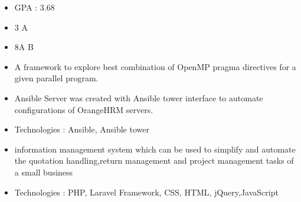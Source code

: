 
\begin{itemize}
    \item GPA : 3.68
    
\end{itemize}

\divider

\begin{itemize}
    \item 3 A
\end{itemize}

\divider

\begin{itemize}
    \item 8A B
\end{itemize}








\begin{itemize}
\item A framework to explore best combination of OpenMP pragma directives for a given parallel program.
\end{itemize}
\smallskip
{}
\begin{itemize}
\item Ansible Server was created with Ansible tower interface to automate
configurations of OrangeHRM servers.
\item Technologies : Ansible, Ansible tower
\end{itemize}
\smallskip
{}
\begin{itemize}
\item information management system which can be used to simplify and automate the quotation handling,return management and project management tasks of a small business
\item Technologies : PHP, Laravel Framework, CSS, HTML, jQuery,JavaScript
\end{itemize}
\smallskip

